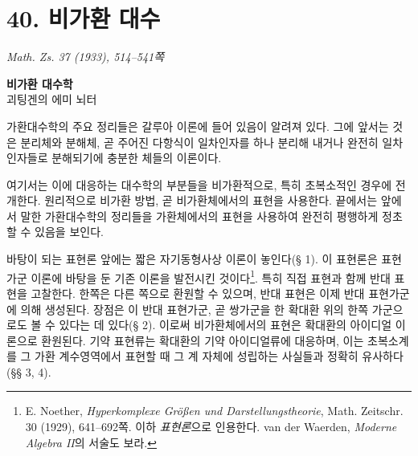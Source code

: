 
\providecommand{\frA}{\mathfrak A}
\providecommand{\frako}{\mathfrak o}
\providecommand{\frB}{\mathfrak B}
\providecommand{\frC}{\mathfrak C}
\providecommand{\frG}{\mathfrak G}
\providecommand{\frL}{\mathfrak L}
\providecommand{\frM}{\mathfrak M}
\providecommand{\frN}{\mathfrak N}
\providecommand{\frR}{\mathfrak R}
\providecommand{\frS}{\mathfrak S}
\providecommand{\frT}{\mathfrak T}
\providecommand{\Gcal}{\mathfrak G}
\providecommand{\mbarA}{\overline{\mathfrak A}}

\section*{40. 비가환 대수}

\begin{center}
\emph{Math. Zs. 37 (1933), 514--541쪽}
\end{center}

\begin{center}
\textbf{비가환 대수학}\\[0.5em]
괴팅겐의 에미 뇌터
\end{center}

가환대수학의 주요 정리들은 갈루아 이론에 들어 있음이 알려져 있다. 그에 앞서는 것은 분리체와 분해체, 곧 주어진 다항식이 일차인자를 하나 분리해 내거나 완전히 일차인자들로 분해되기에 충분한 체들의 이론이다.

여기서는 이에 대응하는 대수학의 부분들을 비가환적으로, 특히 초복소적인 경우에 전개한다. 원리적으로 비가환 방법, 곧 비가환체에서의 표현을 사용한다. 끝에서는 앞에서 말한 가환대수학의 정리들을 가환체에서의 표현을 사용하여 완전히 평행하게 정초할 수 있음을 보인다.

바탕이 되는 표현론 앞에는 짧은 자기동형사상 이론이 놓인다(§ 1). 이 표현론은 표현가군 이론에 바탕을 둔 기존 이론을 발전시킨 것이다\footnote{E. Noether, \emph{Hyperkomplexe Größen und Darstellungstheorie}, Math. Zeitschr. 30 (1929), 641--692쪽. 이하 \emph{표현론}으로 인용한다. van der Waerden, \emph{Moderne Algebra II}의 서술도 보라.}. 특히 직접 표현과 함께 반대 표현을 고찰한다. 한쪽은 다른 쪽으로 환원할 수 있으며, 반대 표현은 이제 반대 표현가군에 의해 생성된다. 장점은 이 반대 표현가군, 곧 쌍가군을 한 확대환 위의 한쪽 가군으로도 볼 수 있다는 데 있다(§ 2). 이로써 비가환체에서의 표현은 확대환의 아이디얼 이론으로 환원된다. 기약 표현류는 확대환의 기약 아이디얼류에 대응하며, 이는 초복소계를 그 가환 계수영역에서 표현할 때 그 계 자체에 성립하는 사실들과 정확히 유사하다(§§ 3, 4).

